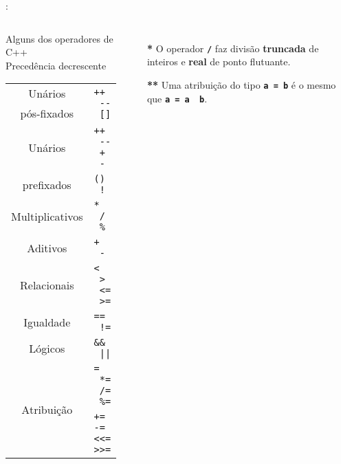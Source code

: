 \begin{frame}{\insertsection: \insertsubsection}

	\begin{columns}[b]
		\begin{block}{\centering Alguns dos operadores de C++\\{\small Precedência decrescente}}
			\begin{tabular}{cl}
				Unários      & \multirow{2}{*}{\texttt{++ \ -\/- \ []}}     \\
				pós-fixados  &                                              \\ \hline
				Unários      & \texttt{++ \ -\/- \ + \ -}                   \\
				prefixados   & \texttt{(\textbf{\HighlightType{tipo}}) \ !} \\ \hline
				Multiplicativos\Highlight{*} & \texttt{* \ / \ \%}          \\ \hline
				Aditivos     & \texttt{+ \ -}                               \\ \hline
				Relacionais  & \texttt{< \ > \ <= \ >=}                     \\ \hline
				Igualdade    & \texttt{== \ !=}                             \\ \hline
				Lógicos      & \texttt{\&\& \ ||}                           \\ \hline
				\multirow{2}{*}{Atribuição\Highlight{**}} & \texttt{= \ *= \ /= \ \%=} \\
				             & \texttt{+= -= <\/<= >\/>=}                   \\ %
			\end{tabular}
		\end{block}

		\begin{itemize}
			\item[\textbf{*}] O operador \textbf{\texttt{/}} faz divisão \textbf{truncada} de inteiros e \textbf{real} de ponto flutuante.
			\item[\textbf{**}] Uma atribuição do tipo \textbf{\texttt{a~=~b}} é o mesmo que \textbf{\texttt{a~=~a~~b}}.
		\end{itemize}
	\end{columns}

\end{frame}


